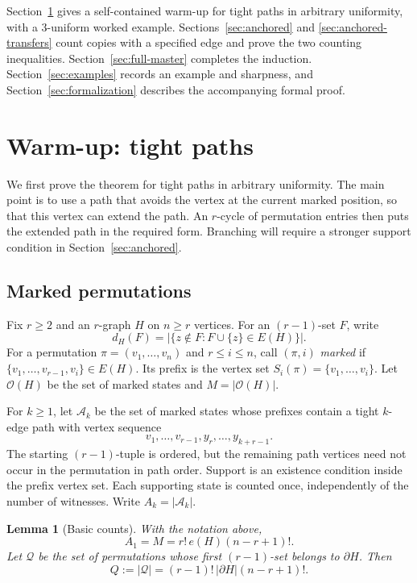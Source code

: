 \documentclass[11pt]{article}
\numberwithin{equation}{section}
\newtheorem{lemma}[theorem]{Lemma}
\theoremstyle{definition}
\newcommand{\cA}{\mathcal A}
\newcommand{\cO}{\mathcal O}
\newcommand{\cQ}{\mathcal Q}
\begin{document}
Section~\ref{sec:paths-r} gives a self-contained warm-up for tight paths
in arbitrary uniformity, with a $3$-uniform worked example.
Sections~\ref{sec:anchored} and
\ref{sec:anchored-transfers} count copies with a specified edge and
prove the two counting inequalities.  Section~\ref{sec:full-master}
completes the induction.
Section~\ref{sec:examples} records an example and sharpness, and
Section~\ref{sec:formalization} describes the accompanying formal proof.

\section{Warm-up: tight paths}
\label{sec:paths-r}

We first prove the theorem for tight paths in arbitrary uniformity.
The main point is to use a path that avoids the vertex at the current
marked position, so that this vertex can extend the path.  An
$r$-cycle of permutation entries then puts the extended path in the
required form.  Branching will require a stronger support condition
in Section~\ref{sec:anchored}.

\subsection{Marked permutations}

Fix $r\geq2$ and an $r$-graph $H$ on $n\geq r$ vertices.  For an
$(r-1)$-set $F$, write
\[
 d_H(F)=|\{z\notin F:F\cup\{z\}\in E(H)\}|.
\]
For a permutation $\pi=(v_1,\ldots,v_n)$ and $r\leq i\leq n$, call
$(\pi,i)$ \emph{marked} if
$\{v_1,\ldots,v_{r-1},v_i\}\in E(H)$.  Its prefix
is the vertex set $S_i(\pi)=\{v_1,\ldots,v_i\}$.
Let $\cO(H)$ be the set of marked states and $M=|\cO(H)|$.

For $k\geq1$, let $\cA_k$ be the set of marked states whose prefixes
contain a tight $k$-edge path with vertex sequence
\begin{equation}
 v_1,\ldots,v_{r-1},y_r,\ldots,y_{k+r-1}.
 \label{eq:rooted-path}
\end{equation}
The starting $(r-1)$-tuple is ordered, but the remaining path vertices
need not occur in the permutation in path order.  Support is an existence
condition inside the prefix vertex set.  Each supporting state is
counted once, independently of the number of witnesses.  Write
$A_k=|\cA_k|$.

\begin{lemma}[Basic counts]
\label{lem:normalization}
With the notation above,
\begin{equation}
 A_1=M=r!\,e(H)(n-r+1)!.
 \label{eq:normalization}
\end{equation}
Let $\cQ$ be the set of permutations whose first $(r-1)$-set belongs to
$\partial H$.  Then
\begin{equation}
 Q:=|\cQ|=(r-1)!\,|\partial H|(n-r+1)!.
 \label{eq:Q}
\end{equation}
\end{lemma}
\end{document}

